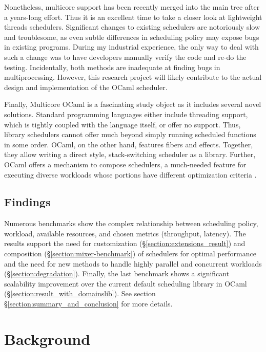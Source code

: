 \documentclass[12pt,a4paper,twoside]{report}
\begin{document}
Nonetheless, multicore support has been recently merged into the main tree after a years-long effort. Thus it is an excellent time to take a closer look at lightweight threads schedulers. Significant changes to existing schedulers are notoriously slow and troublesome, as even subtle differences in scheduling policy may expose bugs in existing programs. During my industrial experience, the only way to deal with such a change was to have developers manually verify the code and re-do the testing. Incidentally, both methods are inadequate at finding bugs in multiprocessing. However, this research project will likely contribute to the actual design and implementation of the OCaml scheduler. 

Finally, Multicore OCaml is a fascinating study object as it includes several novel solutions. Standard programming languages either include threading support, which is tightly coupled with the language itself, or offer no support. Thus, library schedulers cannot offer much beyond simply running scheduled functions in some order. OCaml, on the other hand, features fibers and effects. Together, they allow writing a direct style, stack-switching scheduler as a library. Further, OCaml offers a mechanism to compose schedulers, a much-needed feature for executing diverse workloads whose portions have different optimization criteria \cite{Tennenhouse89layeredmultiplexing}.

\section{Findings}
\label{section:findings}

Numerous benchmarks show the complex relationship between scheduling policy, workload, available resources, and chosen metrics (throughput, latency). The results support the need for customization (\S\ref{section:extensions_result}) and composition (\S\ref{section:mixer-benchmark}) of schedulers for optimal performance and the need for new methods to handle highly parallel and concurrent workloads (\S\ref{section:degradation}). Finally, the last benchmark shows a significant scalability improvement over the current default scheduling library in OCaml (\S\ref{section:result_with_domainslib}). See section \S\ref{section:summary_and_conclusion} for more details.


\chapter{Background}
\end{document}
